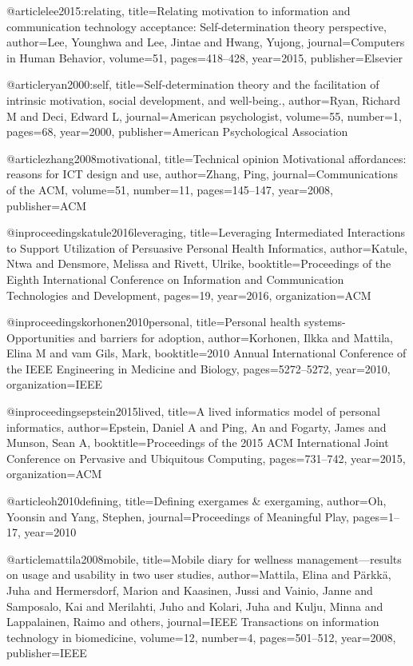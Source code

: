 @article{lee2015:relating,
  title={Relating motivation to information and communication technology acceptance: Self-determination theory perspective},
  author={Lee, Younghwa and Lee, Jintae and Hwang, Yujong},
  journal={Computers in Human Behavior},
  volume={51},
  pages={418--428},
  year={2015},
  publisher={Elsevier}
}

@article{ryan2000:self,
  title={Self-determination theory and the facilitation of intrinsic motivation, social development, and well-being.},
  author={Ryan, Richard M and Deci, Edward L},
  journal={American psychologist},
  volume={55},
  number={1},
  pages={68},
  year={2000},
  publisher={American Psychological Association}
}

@article{zhang2008motivational,
  title={Technical opinion Motivational affordances: reasons for ICT design and use},
  author={Zhang, Ping},
  journal={Communications of the ACM},
  volume={51},
  number={11},
  pages={145--147},
  year={2008},
  publisher={ACM}
}

@inproceedings{katule2016leveraging,
  title={Leveraging Intermediated Interactions to Support Utilization of Persuasive Personal Health Informatics},
  author={Katule, Ntwa and Densmore, Melissa and Rivett, Ulrike},
  booktitle={Proceedings of the Eighth International Conference on Information and Communication Technologies and Development},
  pages={19},
  year={2016},
  organization={ACM}
}

@inproceedings{korhonen2010personal,
  title={Personal health systems-Opportunities and barriers for adoption},
  author={Korhonen, Ilkka and Mattila, Elina M and vam Gils, Mark},
  booktitle={2010 Annual International Conference of the IEEE Engineering in Medicine and Biology},
  pages={5272--5272},
  year={2010},
  organization={IEEE}
}

@inproceedings{epstein2015lived,
  title={A lived informatics model of personal informatics},
  author={Epstein, Daniel A and Ping, An and Fogarty, James and Munson, Sean A},
  booktitle={Proceedings of the 2015 ACM International Joint Conference on Pervasive and Ubiquitous Computing},
  pages={731--742},
  year={2015},
  organization={ACM}
}

@article{oh2010defining,
  title={Defining exergames \& exergaming},
  author={Oh, Yoonsin and Yang, Stephen},
  journal={Proceedings of Meaningful Play},
  pages={1--17},
  year={2010}
}

@article{mattila2008mobile,
  title={Mobile diary for wellness management—results on usage and usability in two user studies},
  author={Mattila, Elina and P{\"a}rkk{\"a}, Juha and Hermersdorf, Marion and Kaasinen, Jussi and Vainio, Janne and Samposalo, Kai and Merilahti, Juho and Kolari, Juha and Kulju, Minna and Lappalainen, Raimo and others},
  journal={IEEE Transactions on information technology in biomedicine},
  volume={12},
  number={4},
  pages={501--512},
  year={2008},
  publisher={IEEE}
}

